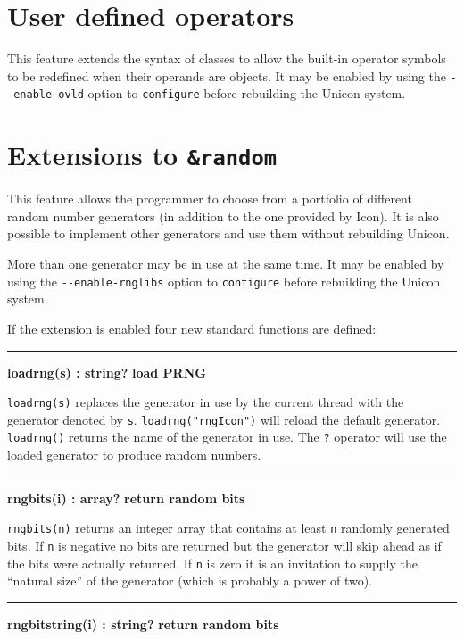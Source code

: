 
\section{User defined operators}
This feature extends the syntax of classes to allow the built-in operator
symbols to be redefined when their operands are objects. It may be enabled by
using the \texttt{-{}-enable-ovld} option to \texttt{configure} before
rebuilding the Unicon system.

\section{Extensions to \texttt{\&random}}
This feature allows the programmer to choose from a portfolio of different
random number generators (in addition to the one provided by Icon). It is also
possible to implement other generators and use them without rebuilding Unicon.

More than one generator may be in use at the same time.  It may be enabled by
using the \texttt{-{}-enable-rnglibs} option to \texttt{configure} before
rebuilding the Unicon system.

If the extension is enabled four new standard functions are defined:
\bigskip\hrule\vspace{0.1cm}
\noindent
{\bf loadrng(s) : string? } \hfill {\bf load PRNG}

\noindent
\texttt{loadrng(s)} replaces the generator in use by the current thread with the generator
denoted by \texttt{s}. \texttt{loadrng("rngIcon")} will reload the default generator.
\texttt{loadrng()} returns the name of the generator in use. The \texttt{?} operator will
use the loaded generator to produce random numbers.

\bigskip\hrule\vspace{0.1cm}
\noindent
{\bf rngbits(i) : array? } \hfill {\bf return random bits}

\noindent
\texttt{rngbits(n)} returns an integer array that contains at least \texttt{n} randomly
generated bits. If \texttt{n} is negative no bits are returned but the generator will skip
ahead as if the bits were actually returned. If \texttt{n} is zero it is an invitation to
supply the ``natural size'' of the generator (which is probably a power of two).

\bigskip\hrule\vspace{0.1cm}
\noindent
{\bf rngbitstring(i) : string? } \hfill {\bf return random bits}

